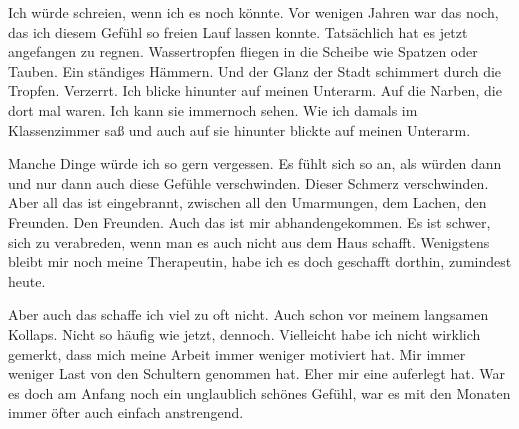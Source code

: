 \documentclass{article}
\begin{document}
	\medskip

	Ich würde schreien, wenn ich es noch könnte. Vor wenigen Jahren war das noch, das ich diesem Gefühl so freien Lauf lassen konnte. Tatsächlich hat es jetzt angefangen zu regnen. Wassertropfen fliegen in die Scheibe wie Spatzen oder Tauben. Ein ständiges Hämmern. Und der Glanz der Stadt schimmert durch die Tropfen. Verzerrt. Ich blicke hinunter auf meinen Unterarm. Auf die Narben, die dort mal waren. Ich kann sie immernoch sehen. Wie ich damals im Klassenzimmer saß und auch auf sie hinunter blickte auf meinen Unterarm.

	\medskip

	Manche Dinge würde ich so gern vergessen. Es fühlt sich so an, als würden dann und nur dann auch diese Gefühle verschwinden. Dieser Schmerz verschwinden. Aber all das ist eingebrannt, zwischen all den Umarmungen, dem Lachen, den Freunden. Den Freunden. Auch das ist mir abhandengekommen. Es ist schwer, sich zu verabreden, wenn man es auch nicht aus dem Haus schafft. Wenigstens bleibt mir noch meine Therapeutin, habe ich es doch geschafft dorthin, zumindest heute.

	\medskip

	Aber auch das schaffe ich viel zu oft nicht. Auch schon vor meinem langsamen Kollaps. Nicht so häufig wie jetzt, dennoch. Vielleicht habe ich nicht wirklich gemerkt, dass mich meine Arbeit immer weniger motiviert hat. Mir immer weniger Last von den Schultern genommen hat. Eher mir eine auferlegt hat. War es doch am Anfang noch ein unglaublich schönes Gefühl, war es mit den Monaten immer öfter auch einfach anstrengend.
\end{document}
